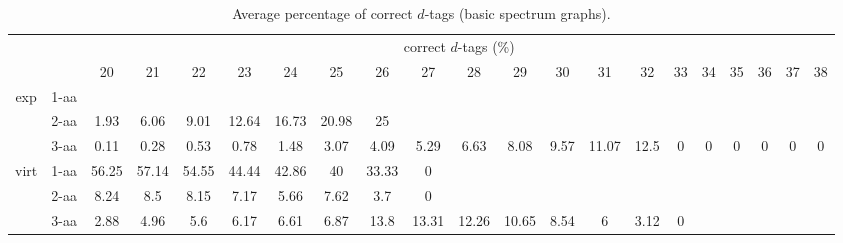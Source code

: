 \documentclass{article}
\begin{document}
\begin{table}[h]\tiny
\vspace{3mm}
{\centering
\begin{center}
\begin{tabular}{|c|l|c|c|c|c|c|c|c|c|c|c|c|c|c|c|c|c|c|c|c|}
  \hline
  \multicolumn{2}{|c|}{ } & \multicolumn{ 19 }{|c|}{ correct $d$-tags (\%)} \\
  \cline{3- 21}
  \multicolumn{2}{|c|}{ }  & 20 & 21 & 22 & 23 & 24 & 25 & 26 & 27 & 28 & 29 & 30 & 31 & 32 & 33 & 34 & 35 & 36 & 37 & 38\\
  \hline
  \multirow{3}{*}{exp}
&  1-aa  &  &  &  &  &  &  &  &  &  &  &  &  &  &  &  &  &  &  & \\&  2-aa  & 1.93 & 6.06 & 9.01 & 12.64 & 16.73 & 20.98 & 25 &  &  &  &  &  &  &  &  &  &  &  & \\&  3-aa  & 0.11 & 0.28 & 0.53 & 0.78 & 1.48 & 3.07 & 4.09 & 5.29 & 6.63 & 8.08 & 9.57 & 11.07 & 12.5 & 0 & 0 & 0 & 0 & 0 & 0\\ \hline
  \multirow{3}{*}{virt} 
&  1-aa  & 56.25 & 57.14 & 54.55 & 44.44 & 42.86 & 40 & 33.33 & 0 &  &  &  &  &  &  &  &  &  &  & \\&  2-aa  & 8.24 & 8.5 & 8.15 & 7.17 & 5.66 & 7.62 & 3.7 & 0 &  &  &  &  &  &  &  &  &  &  & \\&  3-aa  & 2.88 & 4.96 & 5.6 & 6.17 & 6.61 & 6.87 & 13.8 & 13.31 & 12.26 & 10.65 & 8.54 & 6 & 3.12 & 0 &  &  &  &  & \\ \hline
\end{tabular}
\end{center}
\par}
\centering
\caption{ Average percentage of correct $d$-tags (basic spectrum graphs).}
\vspace{3mm}
\label{table:correct-d-tags}
\end{table}
\end{document}
